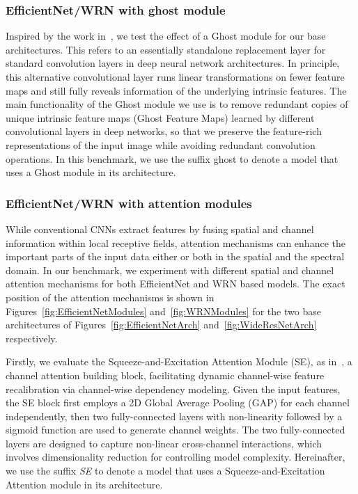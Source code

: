 \documentclass[journal]{IEEEtran}
\begin{document}
\subsubsection{EfficientNet/WRN with ghost module}


Inspired by the work in~\cite{Han_2020_CVPR}, we test the effect of a Ghost module for our base architectures. This refers to an essentially standalone replacement layer for standard convolution layers in deep neural network architectures. In principle, this alternative convolutional layer runs linear transformations on fewer feature maps and still fully reveals information of the underlying intrinsic features. The main functionality of the Ghost module we use is to remove redundant copies of unique intrinsic feature maps (Ghost Feature Maps) learned by different convolutional layers in deep networks, so that we preserve the feature-rich representations of the input image while avoiding redundant convolution operations. In this benchmark, we use the suffix ghost to denote a model that uses a Ghost module in its architecture.








\subsubsection{EfficientNet/WRN with attention modules}
While conventional CNNs extract features by fusing spatial and channel information within local receptive fields, attention mechanisms can enhance the important parts of the input data either or both in the spatial and the spectral domain.
In our benchmark, we experiment with different spatial and channel attention mechanisms for both EfficientNet and WRN based models. The exact position of the attention mechanisms is shown in Figures~\ref{fig:EfficientNetModules} and~\ref{fig:WRNModules} for the two base architectures of Figures~\ref{fig:EfficientNetArch} and~\ref{fig:WideResNetArch} respectively.



Firstly, we evaluate the Squeeze-and-Excitation Attention Module (SE), as in~\cite{Hu_2018_CVPR}, a channel attention building block, facilitating dynamic channel-wise feature recalibration via channel-wise dependency modeling. Given the input features, the SE block first employs a 2D Global Average Pooling (GAP) for each channel independently, then two fully-connected layers with non-linearity followed by a sigmoid function are used to generate channel weights. The two fully-connected layers are designed to capture non-linear cross-channel interactions, which involves dimensionality reduction for controlling model complexity. Hereinafter, we use the suffix \textit{SE} to denote a model that uses a Squeeze-and-Excitation Attention module in its architecture.
\end{document}
